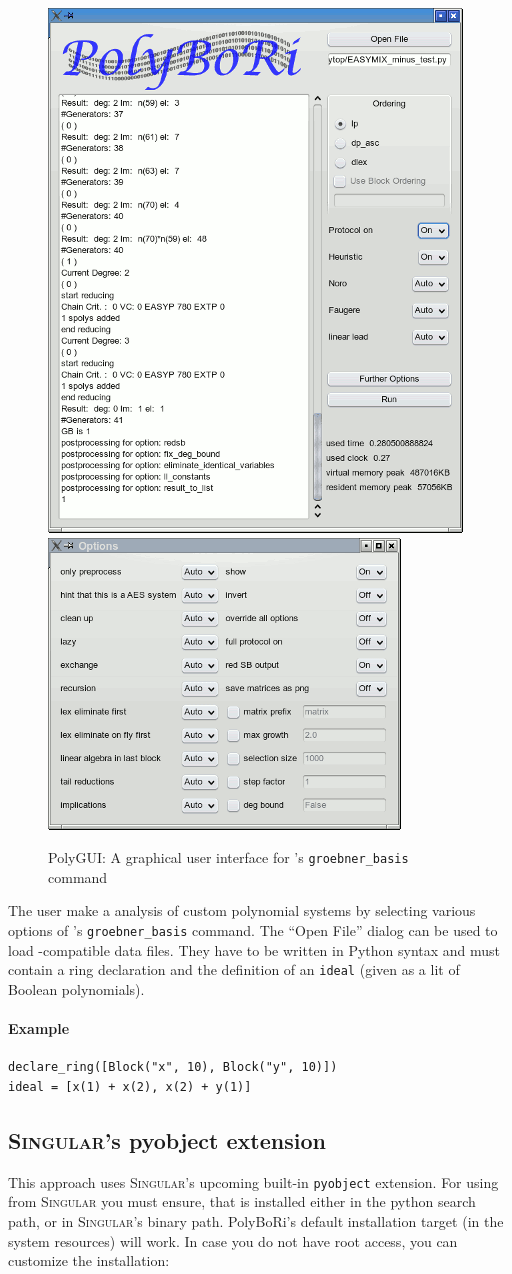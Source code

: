 \begin{figure}
\includegraphics[width=.4\textwidth]{PolyGui}~%
\includegraphics[width=.4\textwidth]{PolyGui-Options}
\caption{PolyGUI:  A graphical user interface for \PolyBoRi's
  \texttt{groebner_basis} command}
\end{figure}


The user make a \Groebner analysis of custom polynomial systems by selecting various options
of \PolyBoRi's \texttt{groebner_basis} command. The ``Open File'' dialog can be
used to load \PolyBoRi-compatible data files. They have to be written in
Python syntax and must contain a ring declaration and the definition of an
\texttt{ideal} (given as a lit of Boolean polynomials).

\paragraph{Example}
\begin{lstlisting}
declare_ring([Block("x", 10), Block("y", 10)])
ideal = [x(1) + x(2), x(2) + y(1)]
\end{lstlisting}

\subsection{\textsc{Singular}'s pyobject extension}

This approach uses \textsc{Singular}'s upcoming built-in \texttt{pyobject}
extension. For using \PolyBoRi from \textsc{Singular} you must ensure, 
that \PolyBoRi is installed either in the python 
search path, or in \textsc{Singular}'s binary path. PolyBoRi's default installation
target (in the system resources) will work. In case you do not have root access,
you can customize the installation:

